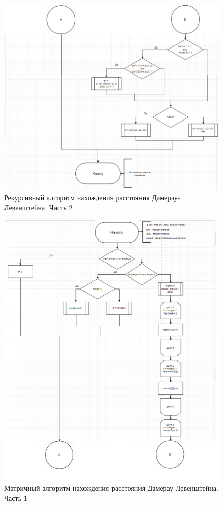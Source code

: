 \documentclass[a4paper,12pt]{report}
\begin{document}
\begin{center}
		\newpage
		\begin{figure}[h!]
			\includegraphics[width=1\linewidth]{d_lev_rec1.jpg}
			\caption{Рекурсивный алгоритм нахождения расстояния Дамерау-Левенштейна. Часть 2}
			\label{ris:recLevD2}
		\end{figure}
		
		\newpage
		\begin{figure}[h!]
			\includegraphics[width=1\linewidth]{lev_mat.jpg}
			\caption{Матричный алгоритм нахождения расстояния Дамерау-Левенштейна. Часть 1}
			\label{ris:matLevD1}
		\end{figure}
		

\end{center}
\end{document}
